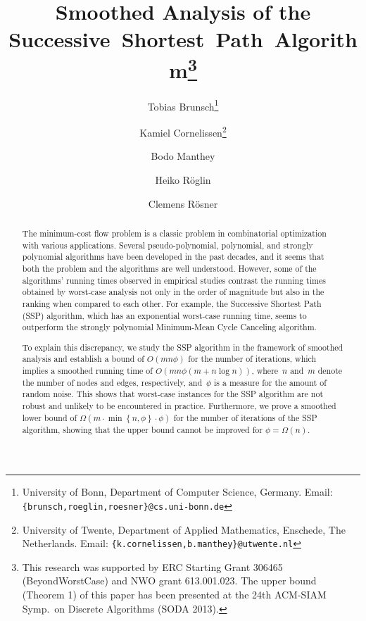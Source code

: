 \documentclass[11pt]{article}
\newcommand{\SET}[1]{\left\{#1\right\}}
\begin{document}
\title{Smoothed Analysis of the Successive~Shortest~Path~Algorithm\thanks{This research was supported by ERC Starting Grant 306465 (BeyondWorstCase)
and NWO grant 613.001.023. The upper bound (Theorem 1) of this paper has been presented at the 24th ACM-SIAM Symp.\ on Discrete Algorithms (SODA 2013).}}

\newcommand*\samethanks[1][\value{footnote}]{\footnotemark[#1]}

\author{Tobias Brunsch\thanks{University of Bonn,
                Department of Computer Science,
                Germany.
                Email: {\tt \{brunsch,roeglin,roesner\}@cs.uni-bonn.de}}
 \and Kamiel Cornelissen\thanks{University of Twente,
              Department of Applied Mathematics,
              Enschede, The Netherlands.
              Email: {\tt \{k.cornelissen,b.manthey\}@utwente.nl}}
 \and Bodo Manthey\samethanks[3]
 \and Heiko R{\"o}glin\samethanks[2]
 \and Clemens R{\"o}sner\samethanks[2]
}

\date{}

\maketitle

 
\begin{abstract}
The minimum-cost flow problem is a classic problem in combinatorial optimization with various applications. Several pseudo-poly\-no\-mi\-al,
polynomial, and strongly polynomial algorithms have been developed in the past decades, and it seems that both the problem and the
algorithms are well understood. However, some of the algorithms' running times observed in empirical studies contrast the running times
obtained by worst-case analysis not only in the order of magnitude but also in the ranking when compared to each other. For example, the
Successive Shortest Path (SSP) algorithm, which has an exponential worst-case running time, seems to outperform the strongly polynomial
Minimum-Mean Cycle Canceling algorithm.

To explain this discrepancy, we study the SSP algorithm in the framework of smoothed analysis and
establish a bound of $O(mn\phi)$ for the number of iterations, which implies a smoothed running time of $O(mn\phi (m + n\log n))$, 
where~$n$ and~$m$ denote the number of nodes and edges, respectively, and~$\phi$ is a measure for the amount of random noise. 
This shows that worst-case instances for the SSP algorithm are not robust and unlikely to be encountered in practice. Furthermore, we prove a
smoothed lower bound of $\Omega(m \cdot \min \SET{ n, \phi } \cdot \phi)$ for the number of iterations of the SSP algorithm, showing that the
upper bound cannot be improved for $\phi = \Omega(n)$.
\end{abstract}
\end{document}
